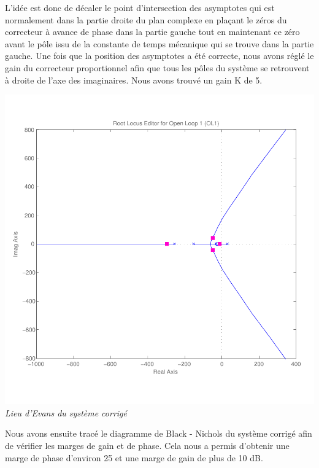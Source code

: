 \documentclass[11pt, french]{article} %
\begin{document}
L'idée est donc de décaler le point d'intersection des asymptotes qui est normalement dans la partie droite du plan complexe en plaçant le zéros du correcteur à avance de phase dans la partie gauche tout en maintenant ce zéro avant le pôle issu de la constante de temps mécanique qui se trouve dans la partie gauche. Une fois que la position des asymptotes a été correcte, nous avons réglé le gain du correcteur proportionnel afin que tous les pôles du système se retrouvent à droite de l'axe des imaginaires. Nous avons trouvé un gain K de 5. 

\begin{center}
\includegraphics[scale=0.50]{RL_Sys_AvPh_K10.pdf}
\\
\emph{Lieu d'Evans du système corrigé}
\end{center}

Nous avons ensuite tracé le diagramme de Black - Nichols du système corrigé afin de vérifier les marges de gain et de phase. Cela nous a permis d'obtenir une marge de phase d'environ 25 et une marge de gain de plus de 10 dB.
\end{document}
